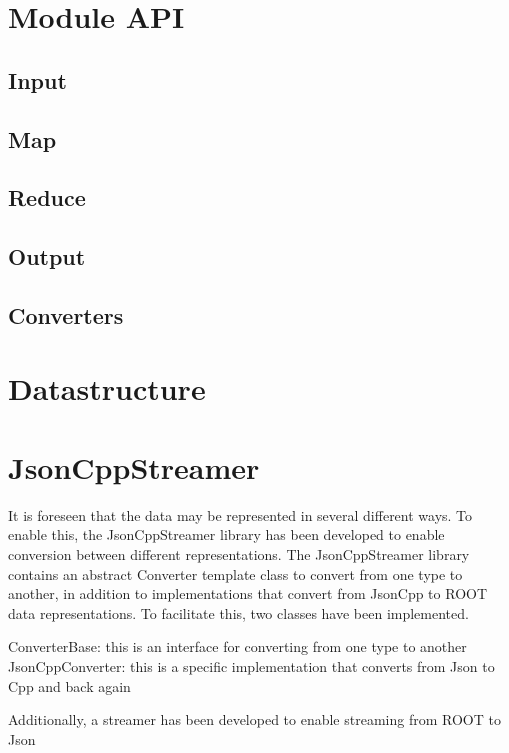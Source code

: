 \section{Module API}

\subsection{Input}

\subsection{Map}

\subsection{Reduce}

\subsection{Output}

\subsection{Converters}


\section{Datastructure}


\section{JsonCppStreamer}
It is foreseen that the data may be represented in several different ways. To enable this, the JsonCppStreamer library has been developed to enable conversion between different representations. The JsonCppStreamer library contains an abstract Converter template class to convert from one type to another, in addition to implementations that convert from JsonCpp to ROOT data representations. To facilitate this, two classes have been implemented.

\begin{itemize}
\li ConverterBase: this is an interface for converting from one type to another
\li JsonCppConverter: this is a specific implementation that converts from Json to Cpp and back again
\end{itemize}

Additionally, a streamer has been developed to enable streaming from ROOT to Json

